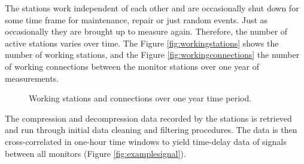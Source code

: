 \documentclass[12pt,a4paper,english]{article}
\begin{document}
The stations work independent of each other and are occasionally shut down for some time frame for maintenance, repair or just random events. Just as occasionally they are brought up to measure again.  Therefore, the number of active stations varies over time. The Figure \ref{fig:workingstations} shows the number of working stations, and the Figure \ref{fig:workingconnections} the number of working connections between the monitor stations over one year of measurements. 

\begin{figure}[ht] 
  \centering 
{}
\caption{Working stations and connections over one year time period. }
\label{fig:workingmonitors}
\end{figure}

The compression and decompression data recorded by the stations is retrieved and run through initial data cleaning and filtering procedures. The data is then cross-correlated in one-hour time windows to yield time-delay data of signals between all monitors (Figure \ref{fig:examplesignal}). 
\end{document}
